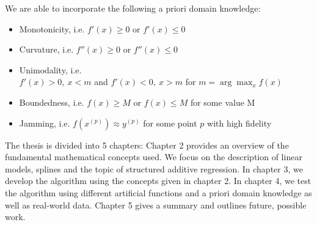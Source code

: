 We are able to incorporate the following a priori domain knowledge: 

\begin{itemize} \label{list:possible-constraints}
	\item Monotonicity, i.e. $f'(x) \ge 0$ or $f'(x) \le 0$
	\item Curvature, i.e. $f''(x) \ge 0$ or $f''(x) \le 0$
	\item Unimodality, i.e. \\ $f'(x) > 0, \ x < m$ and $f'(x) < 0, \ x > m$ for $m = \arg \max_{x} f(x)$
	\item Boundedness, i.e. $f(x) \ge M$ or $f(x) \le M$ for some value M
	\item Jamming, i.e. $f(x^{(p)}) \approx y^{(p)}$ for some point $p$ with high fidelity
\end{itemize}

The thesis is divided into 5 chapters: Chapter 2 provides an overview of the fundamental mathematical concepts used. We focus on the description of linear models, splines and the topic of structured additive regression. In chapter 3, we develop the algorithm using the concepts given in chapter 2. In chapter 4, we test the algorithm using different artificial functions and a priori domain knowledge as well as real-world data. Chapter 5 gives a summary and outlines future, possible work. 
